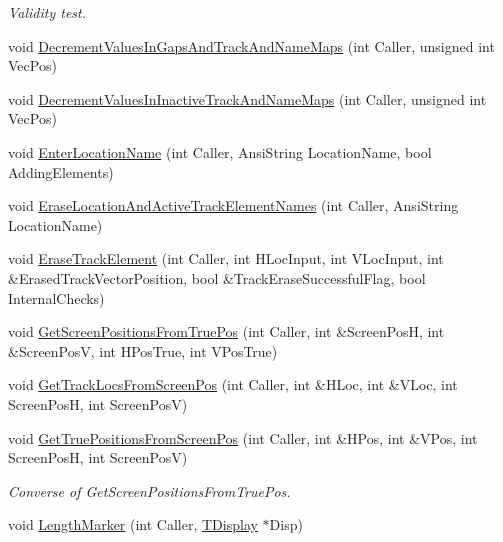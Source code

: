 \begin{DoxyCompactItemize}
\begin{DoxyCompactList}\small\item\em Validity test. \end{DoxyCompactList}\item 
void \mbox{\hyperlink{class_t_track_a2095a52c4b914bf6b29529a2d82043e9}{Decrement\+Values\+In\+Gaps\+And\+Track\+And\+Name\+Maps}} (int Caller, unsigned int Vec\+Pos)
\item 
void \mbox{\hyperlink{class_t_track_af8f925ac5e7301c1094cec76808e1140}{Decrement\+Values\+In\+Inactive\+Track\+And\+Name\+Maps}} (int Caller, unsigned int Vec\+Pos)
\item 
void \mbox{\hyperlink{class_t_track_a433736aed04f76b3d0c39f0696c3bb18}{Enter\+Location\+Name}} (int Caller, Ansi\+String Location\+Name, bool Adding\+Elements)
\item 
void \mbox{\hyperlink{class_t_track_a13a1cc9770c8729d04ad4c0130f91634}{Erase\+Location\+And\+Active\+Track\+Element\+Names}} (int Caller, Ansi\+String Location\+Name)
\item 
void \mbox{\hyperlink{class_t_track_aa7b58c83ca1743ad3e4607ac0af9c71c}{Erase\+Track\+Element}} (int Caller, int H\+Loc\+Input, int V\+Loc\+Input, int \&Erased\+Track\+Vector\+Position, bool \&Track\+Erase\+Successful\+Flag, bool Internal\+Checks)
\item 
void \mbox{\hyperlink{class_t_track_abda5d1209d5a197f1cefb851f567736d}{Get\+Screen\+Positions\+From\+True\+Pos}} (int Caller, int \&Screen\+PosH, int \&Screen\+PosV, int H\+Pos\+True, int V\+Pos\+True)
\item 
void \mbox{\hyperlink{class_t_track_ac57ebd0462a3e0d8323e7b5cbc0e20ca}{Get\+Track\+Locs\+From\+Screen\+Pos}} (int Caller, int \&H\+Loc, int \&V\+Loc, int Screen\+PosH, int Screen\+PosV)
\item 
\mbox{\label{class_t_track_a21ad3e4a9e659cf12122691951e19fb6}} 
void \mbox{\hyperlink{class_t_track_a21ad3e4a9e659cf12122691951e19fb6}{Get\+True\+Positions\+From\+Screen\+Pos}} (int Caller, int \&H\+Pos, int \&V\+Pos, int Screen\+PosH, int Screen\+PosV)
\begin{DoxyCompactList}\small\item\em Converse of Get\+Screen\+Positions\+From\+True\+Pos. \end{DoxyCompactList}\item 
\mbox{\label{class_t_track_a8520abf65484aa83a28329a633836f97}} 
void \mbox{\hyperlink{class_t_track_a8520abf65484aa83a28329a633836f97}{Length\+Marker}} (int Caller, \mbox{\hyperlink{class_t_display}{T\+Display}} $\ast$Disp)

\end{DoxyCompactItemize}
